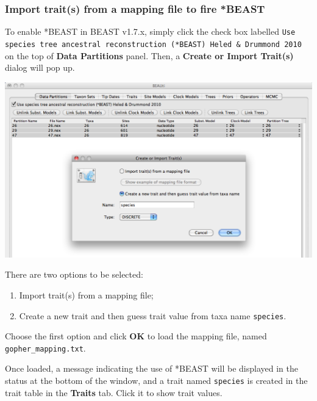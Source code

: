\documentclass[12pt]{article}
\begin{document}
\medskip{}

\subsubsection*{Import trait(s) from a mapping file to fire *BEAST}

To enable *BEAST in BEAST v1.7.x, simply click the check box labelled \texttt{Use species tree ancestral reconstruction (*BEAST) Heled \& Drummond 2010} on the top of {\bf Data Partitions} panel. Then, a {\bf Create or Import Trait(s)} dialog will pop up.   

\medskip{}

\includegraphics[scale=0.4]{figures/BEAUti_CreateImportTrait}

\medskip{}

There are two options to be selected: 
\begin{enumerate}
  \item Import trait(s) from a mapping file; 
  \item Create a new trait and then guess trait value from taxa name \texttt{species}.  
\end{enumerate}

Choose the first option and click \textbf{OK} to load the mapping file, named\\ \texttt{gopher\_mapping.txt}. 

Once loaded, a message indicating the use of *BEAST will be displayed in the status at the bottom of the window, and a trait named \texttt{species} is created in the trait table in the {\bf Traits} tab. Click it to show trait values. 

\medskip{}
\end{document}
